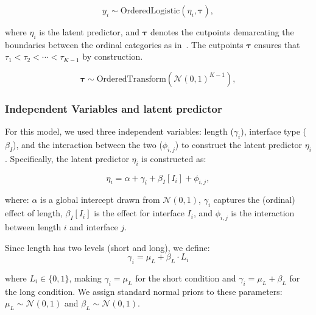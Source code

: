 \begin{equation}
    y_i \sim \text{OrderedLogistic}(\eta_i, \boldsymbol{\tau}),
    \label{eq:cog_main}
\end{equation}

where $\eta_i$ is the latent predictor, and $\boldsymbol{\tau}$ denotes the cutpoints demarcating the boundaries between the ordinal categories as in~. The cutpoints $\boldsymbol{\tau}$ ensures that $\tau_1 < \tau_2 < \cdots < \tau_{K-1}$ by construction.

\begin{equation}
    \boldsymbol{\tau} \sim \text{OrderedTransform}(\mathcal{N}(0, 1)^{K-1}),
    \label{eq:cog_orderedTransfrom}
\end{equation}

\subsubsection{Independent Variables and latent predictor}
For this model, we used three independent variables: length ($\gamma_i$), interface type ($\beta_I$), and the interaction between the two ($\phi_{i,j}$) to construct the latent predictor $\eta_i$. Specifically, the latent predictor $\eta_i$ is constructed as:

\begin{equation}
    \eta_i = \alpha + \gamma_i + \beta_I[I_i] + \phi_{i,j},
    \label{eq:cog_regression}
\end{equation}

where: $\alpha$ is a global intercept drawn from $\mathcal{N}(0,1)$, $\gamma_i$ captures the (ordinal) effect of length, $\beta_I[I_i]$ is the effect for interface $I_i$, and $\phi_{i,j}$ is the interaction between length $i$ and interface $j$. 

Since length has two levels (short and long), we define:
\begin{equation}
    \gamma_i = \mu_L + \beta_L \cdot L_i
    \label{eq:cog_ordinal}
\end{equation}

where $L_i \in \{0,1\}$, making $\gamma_i = \mu_L$ for the short condition and $\gamma_i = \mu_L + \beta_L$ for the long condition. We assign standard normal priors to these parameters: $\mu_L \sim \mathcal{N}(0,1)$ and $\beta_L \sim \mathcal{N}(0,1)$. 

